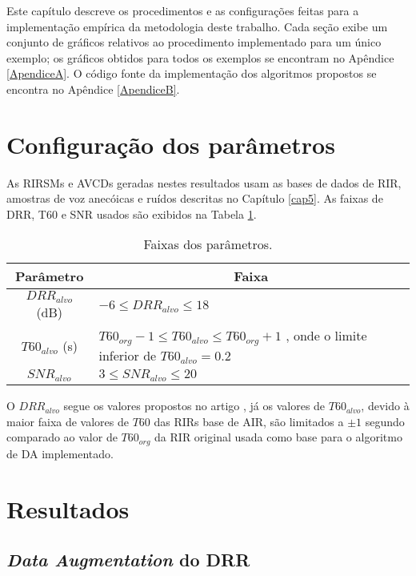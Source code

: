 Este capítulo descreve os procedimentos e as configurações feitas para a implementação empírica da metodologia deste trabalho.
Cada seção exibe um conjunto de gráficos relativos ao procedimento implementado para um único exemplo; os gráficos obtidos para todos
os exemplos se encontram no Apêndice \ref{ApendiceA}.
O código fonte da implementação dos algoritmos propostos se encontra no Apêndice \ref{ApendiceB}.

\section{Configuração dos parâmetros}

As RIRSMs e AVCDs geradas nestes resultados usam as bases de dados de RIR, amostras de voz anecóicas e ruídos descritas no Capítulo \ref{cap5}.
As faixas de DRR, T60 e SNR usados são exibidos na Tabela \ref{tbl:config-param}.

\begin{table} [H]
    \centering
    \caption{Faixas dos parâmetros.}
    \label{tbl:config-param}
    \begin{tabular}{c|p{9cm}}

        \multicolumn{1}{c|}{\textbf{Parâmetro}} & \multicolumn{1}{c}{\textbf{Faixa}} \\
        \hline 

        $DRR_{alvo}$ (dB) & $-6 \le DRR_{alvo} \le 18 $ \\
        $T60_{alvo}$ (s) & $T60_{org} - 1  \le T60_{alvo} \le T60_{org} + 1$ , onde o limite inferior de $T60_{alvo} = 0.2$ \\
        $SNR_{alvo}$ & $3 \le SNR_{alvo} \le 20 $ \\

    \end{tabular}
\end{table}

O $DRR_{alvo}$ segue os valores propostos no artigo \cite{RIR_Data_Aug}, já os valores de $T60_{alvo}$, devido à maior faixa de valores 
de $T60$ das RIRs base de AIR, são limitados a $\pm 1 $ segundo comparado ao valor de $T60_{org}$ da RIR original usada como base para o algoritmo
de DA implementado.

\section{Resultados}

\subsection{\textit{Data Augmentation} do DRR}

